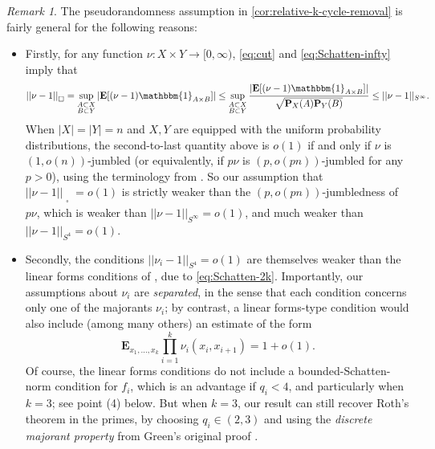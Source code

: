 \documentclass[reqno,11pt]{amsart}
\theoremstyle{definition}
\theoremstyle{remark}
\newtheorem*{remark}{Remark}
\numberwithin{equation}{section}
\renewcommand{\P}{\mathbf{P}}
\newcommand{\E}{\mathbf{E}}
\newcommand{\one}{\mathbbm{1}}
\newcommand{\sq}{_{\substack{ \\ \square}}}
\begin{document}
\begin{remark}
The pseudorandomness assumption in \cref{cor:relative-k-cycle-removal} is fairly general for the following reasons:
\begin{itemize}
    \item[(1).] Firstly, for any function $\nu : X \times Y \to [0, \infty)$, \cref{eq:cut} and \cref{eq:Schatten-infty} imply that
    \[
        ||\nu - 1||\sq 
        =
        \sup_{\substack{A \subset X \\ B \subset Y}}
        |\E[(\nu - 1) \one_{A \times B}]|
        \le 
        \sup_{\substack{A \subset X \\ B \subset Y}}
        \frac{|\E[(\nu - 1) \one_{A \times B}]|}{\sqrt{\P_X(A) \P_Y(B)}}
        \le 
        ||\nu - 1||_{S^\infty}.
    \]
    When $|X| = |Y| = n$ and $X, Y$ are equipped with the uniform probability distributions, the second-to-last quantity above is $o(1)$ if and only if $\nu$ is $(1, o(n))$-jumbled (or equivalently, if $p \nu$ is $(p, o(pn))$-jumbled for any $p > 0$), using the terminology from \cite{conlon2014extremal}.
    So our assumption that $||\nu - 1||\sq = o(1)$ is strictly weaker than the $(p, o(pn))$-jumbledness of $p\nu$, which is weaker than $||\nu - 1||_{S^\infty} = o(1)$, and much weaker than $||\nu - 1||_{S^4} = o(1)$.
    \item[(2).] Secondly, the conditions $||\nu_i - 1||_{S^4} = o(1)$ are themselves weaker than the linear forms conditions of \cite{conlon2014green,tao2006gaussian}, due to \cref{eq:Schatten-2k}. Importantly, our assumptions about $\nu_{i}$ are \emph{separated}, in the sense that each condition concerns only one of the majorants $\nu_{i}$; by contrast, a linear forms-type condition would also include (among many others) an estimate of the form
    \[
        \E_{x_1,\ldots,x_k} \prod_{i=1}^k \nu_{i}(x_i, x_{i+1}) = 1 + o(1).
    \]
    Of course, the linear forms conditions do not include a bounded-Schatten-norm condition for $f_i$, which is an advantage if $q_i < 4$, and particularly when $k = 3$; see point (4) below. But when $k = 3$, our result can still recover Roth's theorem in the primes, by choosing $q_i \in (2, 3)$ and using the \emph{discrete majorant property} from Green's original proof \cite[Lemma 6.6]{green2005roth}. %

\end{itemize}
\end{remark}
\end{document}
